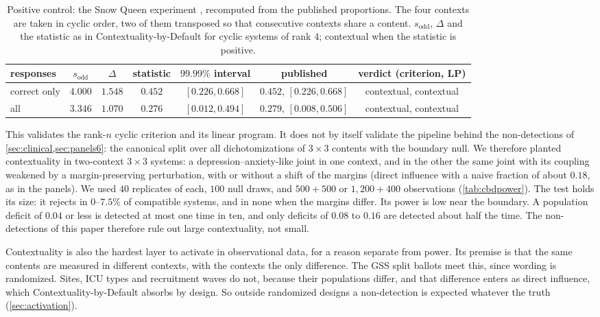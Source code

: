 \documentclass[11pt]{article}
\theoremstyle{definition}
\theoremstyle{remark}
\begin{document}
\begin{table}[ht]
\centering\footnotesize
\caption{Positive control: the Snow Queen experiment \cite{CervantesDzhafarov2018}, recomputed from the published proportions. The four
contexts are taken in cyclic order, two of them transposed so that consecutive contexts share a content. $s_{\mathrm{odd}}$, $\Delta$ and
the statistic as in Contextuality-by-Default for cyclic systems of rank $4$; contextual when the statistic is positive.}\label{tab:snowqueen}
\begin{tabular}{lcccccc}
\toprule
responses & $s_{\mathrm{odd}}$ & $\Delta$ & statistic & $99.99\%$ interval & published & verdict (criterion, LP)\\
\midrule
correct only & $4.000$ & $1.548$ & $0.452$ & $[0.226, 0.668]$ & $0.452$, $[0.226, 0.668]$ & contextual, contextual\\
all & $3.346$ & $1.070$ & $0.276$ & $[0.012, 0.494]$ & $0.279$, $[0.008, 0.506]$ & contextual, contextual\\
\bottomrule
\end{tabular}
\end{table}

This validates the rank-$n$ cyclic criterion and its linear program. It does not by itself validate the pipeline behind the
non-detections of \cref{sec:clinical,sec:panels6}: the canonical split over all dichotomizations of $3\times3$ contents with the boundary
null. We therefore planted contextuality in two-context $3\times3$ systems: a depression--anxiety-like joint in one context, and in the
other the same joint with its coupling weakened by a margin-preserving perturbation, with or without a shift of the margins (direct
influence with a naive fraction of about $0.18$, as in the panels). We used $40$ replicates of each, $100$ null draws, and $500+500$ or
$1{,}200+400$ observations (\cref{tab:cbdpower}). The test holds its size: it rejects in $0$--$7.5\%$ of compatible systems, and in none
when the margins differ. Its power is low near the boundary. A population deficit of $0.04$ or less is detected at most one time in ten,
and only deficits of $0.08$ to $0.16$ are detected about half the time. The non-detections of this paper therefore rule out large
contextuality, not small.

Contextuality is also the hardest layer to activate in observational data, for a reason separate from power. Its premise is that the
same contents are measured in different contexts, with the contexts the only difference. The GSS split ballots meet this, since wording is
randomized. Sites, ICU types and recruitment waves do not, because their populations differ, and that difference enters as direct
influence, which Contextuality-by-Default absorbs by design. So outside randomized designs a non-detection is expected whatever the truth
(\cref{sec:activation}).
\end{document}
